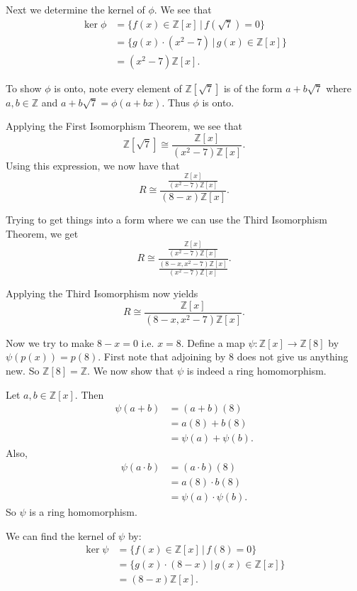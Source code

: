 \documentclass{article}
\begin{document}
Next we determine the kernel of $\phi$. We see that
\begin{align*}
	\ker \phi &= \{f(x) \in \mathbb{Z}[x] \, \vert \, f(\sqrt{7}) = 0 \} \\
	&= \{ g(x) \cdot (x^2 -7) \, \vert \, g(x) \in \mathbb{Z}[x] \} \\
	&= (x^2-7) \mathbb{Z}[x].
\end{align*}

To show $\phi$ is onto, note every element of $\mathbb{Z}[\sqrt{7}]$ is of the form $a + b\sqrt{7}$ where $a, b \in \mathbb{Z}$ and $a + b\sqrt{7} = \phi(a+bx)$. Thus $\phi$ is onto.

Applying the First Isomorphism Theorem, we see that
$$ \mathbb{Z}[\sqrt{7}] \cong \frac{\mathbb{Z}[x]}{(x^2-7)\mathbb{Z}[x]}. $$
Using this expression, we now have that
$$R \cong \frac{\frac{\mathbb{Z}[x]}{(x^2-7)\mathbb{Z}[x]}}
{(8-x)\mathbb{Z}[x]}.  $$

Trying to get things into a form where we can use the Third Isomorphism Theorem, we get
$$R \cong \frac{\frac{\mathbb{Z}[x]}{(x^2-7)\mathbb{Z}[x]}}
{\frac{(8-x, x^2-7)\mathbb{Z}[x]}{(x^2-7)\mathbb{Z}[x]}}.  $$

Applying the Third Isomorphism now yields
$$ R \cong \frac{\mathbb{Z}[x]}{(8-x, x^2-7)\mathbb{Z}[x]}. $$

Now we try to make $8-x = 0$ i.e. $x = 8$. Define a map $\psi : \mathbb{Z}[x] \to \mathbb{Z}[8]$ by $\psi(p(x)) = p(8)$. First note that adjoining by $8$ does not give us anything new. So $\mathbb{Z}[8] = \mathbb{Z}$. We now show that $\psi$ is indeed a ring homomorphism.

Let $a, b \in \mathbb{Z}[x]$. Then
\begin{align*}
	\psi(a+b) &= (a+b)(8) \\
	&= a(8) + b(8) \\
	&= \psi(a) + \psi(b).
\end{align*}
Also,
\begin{align*}
	\psi(a \cdot b) &= (a \cdot b)(8) \\
	&= a(8) \cdot b(8) \\
	&= \psi(a) \cdot \psi(b).
\end{align*}
So $\psi$ is a ring homomorphism.

We can find the kernel of $\psi$ by:
\begin{align*}
		\ker \psi &= \{f(x) \in \mathbb{Z}[x] \, \vert \, f(8) = 0 \} \\
		&= \{ g(x) \cdot (8-x) \, \vert \, g(x) \in \mathbb{Z}[x] \} \\
		&= (8-x) \mathbb{Z}[x].
\end{align*}
\end{document}
